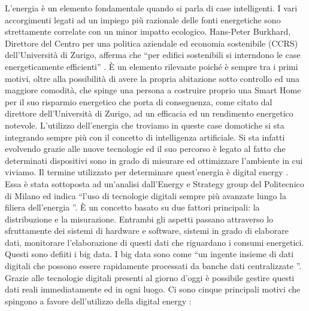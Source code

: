 L’energia è un elemento fondamentale quando si parla di case intelligenti. I vari accorgimenti legati ad un impiego più razionale delle fonti energetiche sono strettamente correlate con un minor impatto ecologico. Hans-Peter Burkhard, Direttore del Centro per una politica aziendale ed economia sostenibile (CCRS) dell’Università di Zurigo, afferma che “per edifici sostenibili si interndono le case energeticamente efficienti” .
È un elemento rilevante poiché è sempre tra i primi motivi, oltre  alla possibilità di avere la propria abitazione sotto controllo ed una maggiore comodità, che spinge una persona a costruire proprio una Smart Home per il suo risparmio energetico che porta di conseguenza, come citato dal direttore dell’Università di Zurigo, ad un efficacia ed un rendimento energetico notevole.
L’utilizzo dell’energia che troviamo in queste case domotiche si sta integrando sempre più con il concetto di intelligenza artificiale. Si sta infatti evolvendo grazie alle nuove tecnologie ed il suo percorso è legato al fatto che determinati dispositivi sono in grado di misurare ed ottimizzare l’ambiente in cui viviamo.
Il termine utilizzato per determinare quest’energia è digital energy . Essa è stata sottoposta ad un’analisi dall’Energy e Strategy group del Politecnico di Milano ed indica “l’uso di tecnologie digitali sempre più avanzate lungo la filiera dell’energia ”. È un concetto basato su due fattori principali: la distribuzione e la misurazione. Entrambi gli aspetti passano attraverso lo sfruttamente dei sistemi di hardware e software, sistemi in grado di elaborare dati, monitorare l’elaborazione di questi dati che riguardano i consumi energetici. Questi sono defiiti i big data. I big data sono come “un ingente insieme di dati digitali che possono essere rapidamente processati da banche dati centralizzate ”. Grazie alle tecnologie digitali presenti al giorno d’oggi è possibile gestire questi dati reali immediatamente ed in ogni luogo. Ci sono cinque principali motivi che spingono a favore dell’utilizzo della digital energy :
